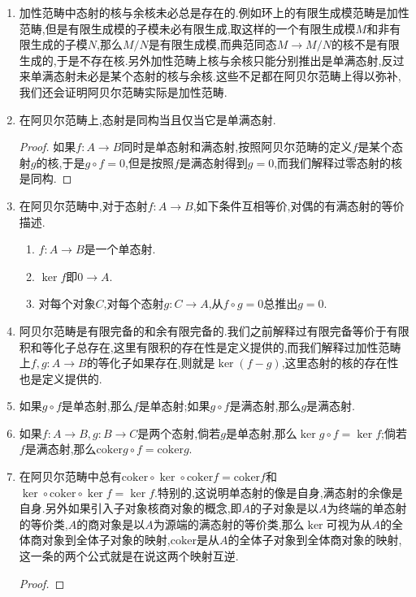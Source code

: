 \begin{enumerate}
	\item 加性范畴中态射的核与余核未必总是存在的.例如环上的有限生成模范畴是加性范畴,但是有限生成模的子模未必有限生成,取这样的一个有限生成模$M$和非有限生成的子模$N$,那么$M/N$是有限生成模,而典范同态$M\to M/N$的核不是有限生成的,于是不存在核.另外加性范畴上核与余核只能分别推出是单满态射,反过来单满态射未必是某个态射的核与余核.这些不足都在阿贝尔范畴上得以弥补,我们还会证明阿贝尔范畴实际是加性范畴.
	\item 在阿贝尔范畴上,态射是同构当且仅当它是单满态射.
	\begin{proof}
		
	如果$f:A\to B$同时是单态射和满态射,按照阿贝尔范畴的定义$f$是某个态射$g$的核,于是$g\circ f=0$,但是按照$f$是满态射得到$g=0$,而我们解释过零态射的核是同构.
	\end{proof}
    \item 在阿贝尔范畴中,对于态射$f:A\to B$,如下条件互相等价,对偶的有满态射的等价描述.
    \begin{enumerate}
    	\item $f:A\to B$是一个单态射.
    	\item $\ker f$即$0\to A$.
    	\item 对每个对象$C$,对每个态射$g:C\to A$,从$f\circ g=0$总推出$g=0$.
    \end{enumerate}
    \item 阿贝尔范畴是有限完备的和余有限完备的.我们之前解释过有限完备等价于有限积和等化子总存在,这里有限积的存在性是定义提供的,而我们解释过加性范畴上$f,g:A\to B$的等化子如果存在,则就是$\ker(f-g)$,这里态射的核的存在性也是定义提供的.
    \item 如果$g\circ f$是单态射,那么$f$是单态射;如果$g\circ f$是满态射,那么$g$是满态射.
    \item 如果$f:A\to B,g:B\to C$是两个态射,倘若$g$是单态射,那么$\ker g\circ f=\ker f$;倘若$f$是满态射,那么$\mathrm{coker}g\circ f=\mathrm{coker}g$.
    \item 在阿贝尔范畴中总有$\mathrm{coker}\circ\ker\circ\mathrm{coker}f=\mathrm{coker}f$和$\ker\circ\mathrm{coker}\circ\ker f=\ker f$.特别的,这说明单态射的像是自身,满态射的余像是自身.另外如果引入子对象核商对象的概念,即$A$的子对象是以$A$为终端的单态射的等价类,$A$的商对象是以$A$为源端的满态射的等价类,那么$\ker$可视为从$A$的全体商对象到全体子对象的映射,$\mathrm{coker}$是从$A$的全体子对象到全体商对象的映射,这一条的两个公式就是在说这两个映射互逆.
    \begin{proof}
    	

\end{proof}
\end{enumerate}
